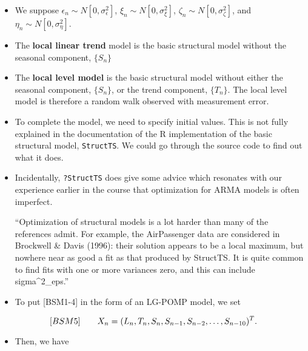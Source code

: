 \documentclass[]{article}
\providecommand{\tightlist}{%
  \setlength{\itemsep}{0pt}\setlength{\parskip}{0pt}}
\begin{document}
\begin{itemize}
\item
  We suppose \(\epsilon_n\sim N[0,\sigma^2_\epsilon]\),
  \(\xi_n\sim N[0,\sigma^2_\xi]\), \(\zeta_n\sim N[0,\sigma^2_\zeta]\),
  and \(\eta_n\sim N[0,\sigma^2_\eta]\).
\item
  The \textbf{local linear trend} model is the basic structural model
  without the seasonal component, \(\{S_n\}\)
\item
  The \textbf{local level model} is the basic structural model without
  either the seasonal component, \(\{S_n\}\), or the trend component,
  \(\{T_n\}\). The local level model is therefore a random walk observed
  with measurement error.
\item
  To complete the model, we need to specify initial values. This is not
  fully explained in the documentation of the R implementation of the
  basic structural model, \texttt{StructTS}. We could go through the
  source code to find out what it does.
\item
  Incidentally, \texttt{?StructTS} does give some advice which resonates
  with our experience earlier in the course that optimization for ARMA
  models is often imperfect.

  ``Optimization of structural models is a lot harder than many of the
  references admit. For example, the
 AirPassenger data are considered in Brockwell
  \& Davis (1996): their solution appears to be a local maximum, but
  nowhere near as good a fit as that produced by
  StructTS. It is quite common to find fits with
  one or more variances zero, and this can include sigma\^{}2\_eps.''
\item
  To put {[}BSM1-4{]} in the form of an LG-POMP model, we set
\end{itemize}

$$[BSM5]
\quad\quad X_n = (L_n,T_n,S_n, S_{n-1}, S_{n-2}, \dots,S_{n-10})^{\scriptsize{T}}.$$

\begin{itemize}
\tightlist
\item
  Then, we have
\end{itemize}
\end{document}
